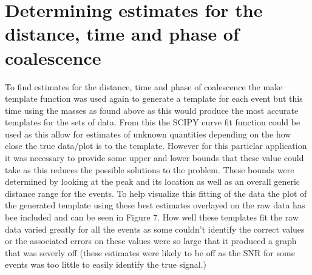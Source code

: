 \documentclass[]{article}
\begin{document}
\section*{Determining estimates for the distance, time and phase of coalescence}



To find estimates for the distance, time and phase of coalescence the make template function was used again
to generate a template for each event but this time using the masses as found above
as this would produce the most accurate templates for the sets of data.
From this the SCIPY curve fit function could be used as this allow for estimates of unknown quantities depending on the
how close the true data/plot is to the template. However for this particlar application
it was necessary to provide some upper and lower bounds that these value could take as this reduces the possible solutions
to the problem. These bounds were determined by looking at the peak and its location as well as an overall generic distance range
for the events. To help visualize this fitting of the data the plot of the generated template using these best estimates
overlayed on the raw data has bee included and can be seen in Figure 7.
How well these templates fit the raw data varied greatly for all the events as some couldn't identify the correct values
or the associated errors on these values were so large that it produced a graph that was severly off (these estimates were likely to be off
as the SNR for some events was too little to easily identify the true signal.)
\end{document}
